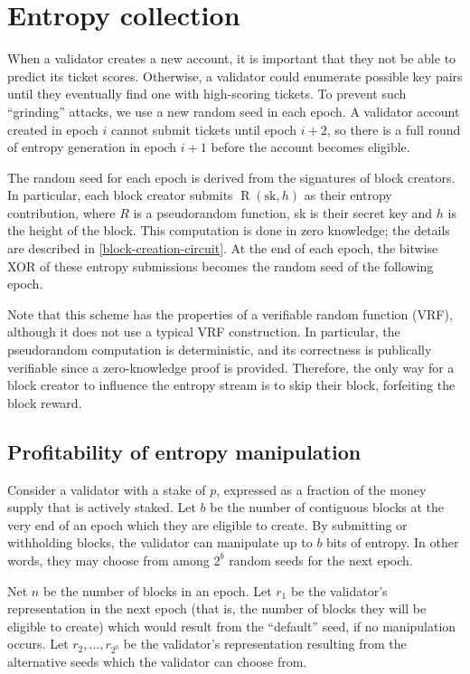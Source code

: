 \section{Entropy collection}
\label{entropy}

When a validator creates a new account, it is important that they not be able to predict its ticket scores. Otherwise, a validator could enumerate possible key pairs until they eventually find one with high-scoring tickets. To prevent such ``grinding'' attacks, we use a new random seed in each epoch. A validator account created in epoch $i$ cannot submit tickets until epoch $i + 2$, so there is a full round of entropy generation in epoch $i + 1$ before the account becomes eligible.

The random seed for each epoch is derived from the signatures of block creators. In particular, each block creator submits $\operatorname{R}(\mathrm{sk}, h)$ as their entropy contribution, where $R$ is a pseudorandom function, sk is their secret key and $h$ is the height of the block. This computation is done in zero knowledge; the details are described in \autoref{block-creation-circuit}. At the end of each epoch, the bitwise XOR of these entropy submissions becomes the random seed of the following epoch.

Note that this scheme has the properties of a verifiable random function (VRF), although it does not use a typical VRF construction. In particular, the pseudorandom computation is deterministic, and its correctness is publically verifiable since a zero-knowledge proof is provided. Therefore, the only way for a block creator to influence the entropy stream is to skip their block, forfeiting the block reward.

\subsection{Profitability of entropy manipulation}

Consider a validator with a stake of $p$, expressed as a fraction of the money supply that is actively staked. Let $b$ be the number of contiguous blocks at the very end of an epoch which they are eligible to create. By submitting or withholding blocks, the validator can manipulate up to $b$ bits of entropy. In other words, they may choose from among $2^b$ random seeds for the next epoch.

Net $n$ be the number of blocks in an epoch. Let $r_1$ be the validator's representation in the next epoch (that is, the number of blocks they will be eligible to create) which would result from the ``default'' seed, if no manipulation occurs. Let $r_2, \dots, r_{2^b}$ be the validator's representation resulting from the alternative seeds which the validator can choose from.

